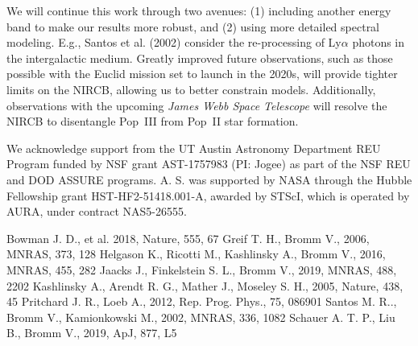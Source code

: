 \documentclass[11pt,twoside]{article}
\begin{document}
We will continue this work through two avenues: (1) including another energy band
to make our results more robust, and (2) using more detailed spectral modeling. E.g., Santos et al. (2002) consider the re-processing of Ly$\alpha$ photons in the intergalactic medium. Greatly improved future observations, such as those possible with the Euclid mission set to launch in the 2020s, 
will provide tighter limits on the NIRCB, allowing us to better constrain models. Additionally, observations with the upcoming {\it James Webb Space Telescope} will resolve the NIRCB to disentangle Pop~III from Pop~II star formation.


\acknowledgements We acknowledge support from the UT Austin Astronomy Department REU Program funded by NSF
grant AST-1757983 (PI: Jogee) as part of the NSF REU and DOD ASSURE programs. A. S. was supported by NASA 
through the Hubble Fellowship grant HST-HF2-51418.001-A, awarded by STScI, which is operated by AURA, 
under contract NAS5-26555.

\begin{thebibliography}{}
Bowman J. D., et al. 2018, Nature, 555, 67 
Greif T. H., Bromm V., 2006, MNRAS, 373, 128
Helgason K., Ricotti M., Kashlinsky A., Bromm V., 2016, MNRAS, 455, 282
Jaacks J., Finkelstein S. L., Bromm V., 2019, MNRAS, 488, 2202
Kashlinsky A., Arendt R. G., Mather J., Moseley S. H., 2005, Nature, 438, 45 
Pritchard J. R., Loeb A., 2012, Rep. Prog. Phys., 75, 086901 
Santos M. R.., Bromm V., Kamionkowski M., 2002, MNRAS, 336, 1082
Schauer A. T. P., Liu B., Bromm V., 2019, ApJ, 877, L5

\end{thebibliography}
\end{document}

